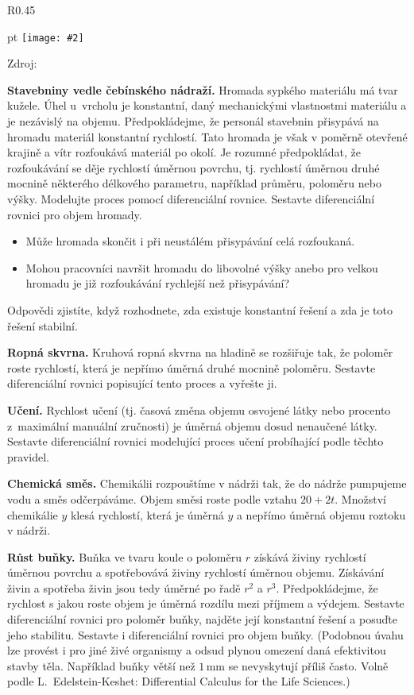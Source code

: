 \documentclass{article}
\def\zlomek{0.45}
\def\nic{}
\newcommand\obrazek[2][pixabay.com]{
  \clearpage
  \def\test{#1}
\begin{wrapfigure}{R}{\zlomek\linewidth}
  \begin{minipage}{1.0\linewidth}\parskip 0 pt
  \texttt{[image: \#2]}

  \vspace*{-10pt}
  \ifx\test\nic\else
  \null\hfill{\color{gray}\footnotesize Zdroj: #1}
  \fi

  \mezera
  \end{minipage}
\end{wrapfigure}
}
\let\oldtextbf\textbf
\def\textbf#1{%
  \oldtextbf{\color{red} #1}}
\def\mezera{\vspace*{10pt}}
\begin{document}
\newpage

\obrazek[]{pokros.jpg}


\textbf{Stavebniny vedle čebínského nádraží.} Hromada sypkého materiálu
má tvar kužele. Úhel u~vrcholu je konstantní, daný mechanickými
vlastnostmi materiálu a je nezávislý na objemu. Předpokládejme, že
personál stavebnin přisypává na hromadu materiál konstantní rychlostí. Tato
hromada je však v poměrně otevřené krajině a vítr rozfoukává materiál
po okolí. Je rozumné předpokládat, že rozfoukávání se děje rychlostí
úměrnou povrchu, tj. rychlostí úměrnou druhé mocnině některého
délkového parametru, například průměru, poloměru nebo výšky. Modelujte
proces pomocí diferenciální rovnice. Sestavte diferenciální rovnici
pro objem hromady.
\begin{itemize}
 pt
\item Může hromada skončit i při neustálém přisypávání celá rozfoukaná. 
\item Mohou pracovníci navršit hromadu do libovolné výšky anebo pro velkou hromadu je již rozfoukávání rychlejší než přisypávání?
\end{itemize}
Odpovědi zjistíte, když
rozhodnete, zda existuje konstantní řešení a zda je toto řešení
stabilní.



\newpage

\textbf{Ropná skvrna.} Kruhová ropná skvrna na hladině se rozšiřuje
tak, že poloměr roste rychlostí, která je nepřímo úměrná druhé mocnině
poloměru. Sestavte diferenciální rovnici popisující tento proces a
vyřešte ji.

\textbf{Učení.} Rychlost učení (tj. časová změna objemu osvojené látky
nebo procento z~maximální manuální zručnosti) je úměrná objemu dosud
nenaučené látky. Sestavte diferenciální rovnici modelující proces
učení probíhající podle těchto pravidel.


\textbf{Chemická směs.} Chemikálii rozpouštíme v nádrži tak, že do
nádrže pumpujeme vodu a směs odčerpáváme. Objem směsi roste podle
vztahu $20+2t$. Množství chemikálie $y$ klesá rychlostí, která je
úměrná $y$ a nepřímo úměrná objemu roztoku v nádrži.


\textbf{Růst buňky.} Buňka ve tvaru koule o poloměru $r$ získává
živiny rychlostí úměrnou povrchu a spotřebovává živiny rychlostí
úměrnou objemu. Získávání živin a spotřeba živin jsou tedy úměrné po
řadě $r^2$ a $r^3$. Předpokládejme, že rychlost s jakou roste objem je
úměrná rozdílu mezi příjmem a výdejem. Sestavte diferenciální rovnici
pro poloměr buňky, najděte její konstantní řešení a posuďte jeho
stabilitu. Sestavte i diferenciální rovnici pro objem buňky. (Podobnou
úvahu lze provést i pro jiné živé organismy a odsud plynou omezení
daná efektivitou stavby těla. Například buňky větší než
$1\,\mathrm{mm}$ se nevyskytují příliš často. Volně podle
L.~Edelstein-Keshet: Differential Calculus for the Life Sciences.)
\end{document}
